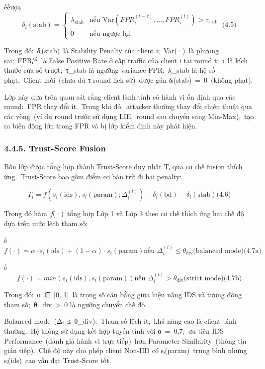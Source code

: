 ếếượạ\\
\[\delta_{i}(\text{stab}) = \left\{ \begin{matrix}
\lambda_{\text{stab}} & \text{nếu~Var}(FPR_{i}^{\left( t-\tau \right)},\ldots,FPR_{i}^{(t)}) > \tau_{\text{stab}} \\
0 & \text{nếu ngược lại}
\end{matrix} \right.\ \text{(4.5)}
\]

Trong đó:~δᵢ(stab)~là Stability Penalty của client i;~Var(·)~là phương sai;~FPRᵢ⁽ᵗ⁾~là False Positive Rate ở cấp traffic của client i tại round t;~τ là kích thước cửa sổ trượt;~τ\_stab là ngưỡng variance FPR;~λ\_stab là hệ số phạt.~Client mới~(chưa đủ τ round lịch sử)~được gán δᵢ(stab)~=~0~(không phạt).

Lớp này dựa trên quan sát rằng client lành tính có hành vi ổn định qua các round:~FPR thay đổi ít.~Trong khi đó,~attacker thường thay đổi chiến thuật qua các vòng~(ví dụ round trước sử dụng LIE,~round sau chuyển sang Min-Max),~tạo ra biến động lớn trong FPR và bị lớp kiểm định này phát hiện.

\subsubsection{4.4.5. Trust-Score Fusion}\label{trust-score-fusion}

Bốn lớp được tổng hợp thành Trust-Score duy nhất Tᵢ qua cơ chế fusion thích ứng.~Trust-Score bao gồm điểm cơ bản trừ đi hai penalty:

\[T_{i} = f(s_{i}(\text{ids}),s_{i}(\text{param});\Delta_{i}^{(t)}) - \delta_{i}(\text{bd}) - \delta_{i}(\text{stab})\text{(4.6)}
\]

Trong đó hàm~\emph{f}(·)~tổng hợp Lớp 1 và Lớp 3 theo cơ chế thích ứng hai chế độ dựa trên mức lệch tham số:

ế\\
\[f( \cdot ) = \alpha \cdot s_{i}(\text{ids}) + (1 - \alpha) \cdot s_{i}(\text{param})\text{nếu~}\Delta_{i}^{(t)} \leq \theta_{\text{div}}\text{(balanced mode)(4.7a)}
\]

ế\\
\[f( \cdot ) = min(s_{i}(\text{ids}),s_{i}(\text{param}))\text{nếu~}\Delta_{i}^{(t)} > \theta_{\text{div}}\text{(strict mode)(4.7b)}
\]

Trong đó:~α~∈~{[}0, 1{]}~là trọng số cân bằng giữa hiệu năng IDS và tương đồng tham số;~θ\_div~\textgreater~0 là ngưỡng chuyển chế độ.

Balanced mode~(Δᵢ~≤~θ\_div):~Tham số lệch ít,~khả năng cao là client bình thường.~Hệ thống sử dụng kết hợp tuyến tính với α~=~0,7,~ưu tiên IDS Performance~(đánh giá hành vi trực tiếp)~hơn Parameter Similarity~(thông tin gián tiếp).~Chế độ này cho phép client Non-IID có sᵢ(param)~trung bình nhưng sᵢ(ids)~cao vẫn đạt Trust-Score tốt.

